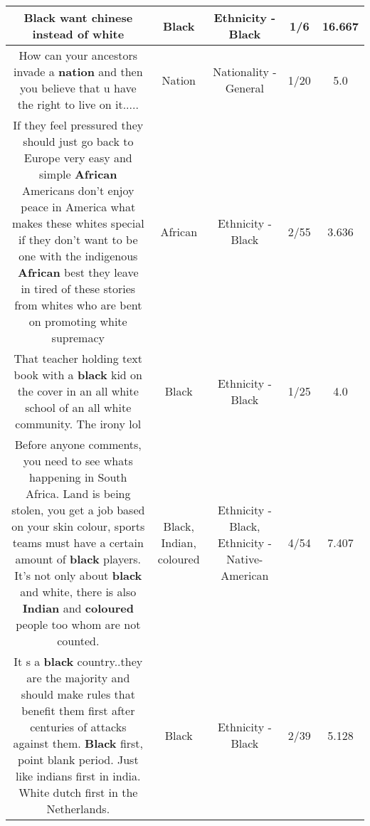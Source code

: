 \documentclass[11pt]{article}
\newlength\mylength
\begin{document}
\begin{center}
\begin{longtable}{|C{.65\mylength}|C{.30\mylength}|C{.12\mylength}|C{.12\mylength}|C{.12\mylength}|}
  \small Black want chinese instead of white\normalsize   & Black & Ethnicity - Black & 1/6 & 16.667 \\  \hline
  \small How can your ancestors invade a \textbf{nation} and then you believe that u have the right to live on it.....\normalsize   & Nation & Nationality - General & 1/20 & 5.0 \\  \hline
  \small If they feel pressured they should just go back to Europe very easy and simple \textbf{African} Americans don't enjoy peace in America what makes these whites special if they don't want to be one with the indigenous \textbf{African} best they leave in tired of these stories from whites who are bent on promoting white supremacy\normalsize   & African & Ethnicity - Black & 2/55 & 3.636 \\  \hline
  \small That teacher holding text book with a \textbf{black} kid on the cover in an all white school of an all white community. The irony lol\normalsize   & Black & Ethnicity - Black & 1/25 & 4.0 \\  \hline
  \small Before anyone comments, you need to see whats happening in South Africa. Land is being stolen, you get a job based on your skin colour, sports teams must have a certain amount of \textbf{black} players. It's not only about \textbf{black} and white, there is also \textbf{Indian} and \textbf{coloured} people too whom are not counted.\normalsize   & Black, Indian, coloured & Ethnicity - Black, Ethnicity - Native-American & 4/54 & 7.407 \\  \hline
  \small It s a \textbf{black} country..they are the majority and should make rules that benefit them  first after centuries of attacks  against them. \textbf{Black} first, point blank period. Just  like indians first in india.  White dutch first in the Netherlands.\normalsize   & Black & Ethnicity - Black & 2/39 & 5.128 \\  \hline

\end{longtable}
\end{center}
\end{document}

